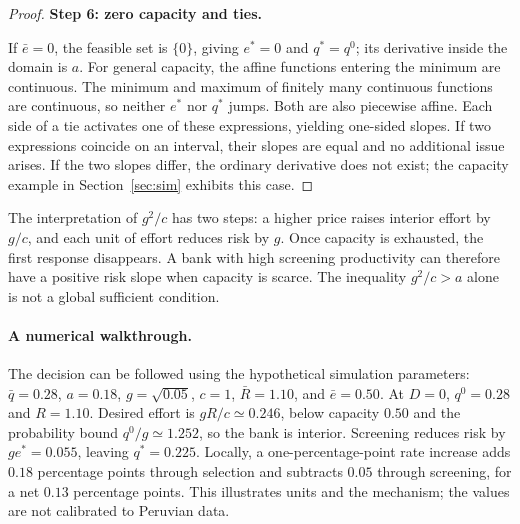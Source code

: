 \documentclass[11pt]{article}
\theoremstyle{definition}\newtheorem{assumption}{Assumption}
\begin{document}
\begin{proof}
\textbf{Step 6: zero capacity and ties.}\par
If $\bar e=0$, the feasible set is $\{0\}$, giving $e^*=0$ and $q^*=q^0$;
its derivative inside the domain is $a$. For general capacity, the affine
functions entering the minimum are continuous. The minimum and maximum of
finitely many continuous functions are continuous, so neither $e^*$ nor
$q^*$ jumps. Both are also piecewise affine. Each side of a tie activates
one of these expressions, yielding one-sided slopes. If two expressions
coincide on an interval, their slopes are equal and no additional issue
arises. If the two slopes differ, the ordinary derivative does not exist;
the capacity example in Section~\ref{sec:sim} exhibits this case.
\end{proof}

The interpretation of $g^2/c$ has two steps: a higher price raises interior
effort by $g/c$, and each unit of effort reduces risk by $g$. Once capacity
is exhausted, the first response disappears. A bank with high screening
productivity can therefore have a positive risk slope when capacity is scarce.
The inequality $g^2/c>a$ alone is not a global sufficient condition.

\paragraph{A numerical walkthrough.}
The decision can be followed using the hypothetical simulation parameters:
$\bar q=0.28$, $a=0.18$, $g=\sqrt{0.05}$, $c=1$, $\bar R=1.10$, and
$\bar e=0.50$. At $D=0$, $q^0=0.28$ and $R=1.10$. Desired effort is
$gR/c\simeq0.246$, below capacity $0.50$ and the probability bound
$q^0/g\simeq1.252$, so the bank is interior. Screening reduces risk by
$ge^*=0.055$, leaving $q^*=0.225$. Locally, a one-percentage-point rate
increase adds $0.18$ percentage points through selection and subtracts
$0.05$ through screening, for a net $0.13$ percentage points. This illustrates
units and the mechanism; the values are not calibrated to Peruvian data.
\end{document}
